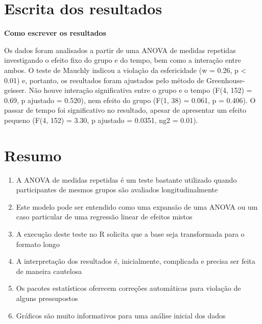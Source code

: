 \documentclass[
]{book}
\providecommand{\tightlist}{%
  \setlength{\itemsep}{0pt}\setlength{\parskip}{0pt}}
\begin{document}
\hypertarget{escrita-dos-resultados-10}{%
\section{Escrita dos resultados}\label{escrita-dos-resultados-10}}

\textbf{Como escrever os resultados}

Os dados foram analisados a partir de uma ANOVA de medidas repetidas investigando o efeito fixo do grupo e do tempo, bem como a interação entre ambos. O teste de Mauchly indicou a violação da esfericidade (w = 0.26, p \textless{} 0.01) e, portanto, os resultados foram ajustados pelo método de Greenhouse-geisser. Não houve interação significativa entre o grupo e o tempo (F(4, 152) = 0.69, p ajustado = 0.520), nem efeito do grupo (F(1, 38) = 0.061, p = 0.406). O passar de tempo foi significativo no resultado, apesar de apresentar um efeito pequeno (F(4, 152) = 3.30, p ajustado = 0.0351, ng2 = 0.01).

\hypertarget{resumo-12}{%
\section{Resumo}\label{resumo-12}}

\begin{enumerate}
\def\labelenumi{\arabic{enumi}.}
\tightlist
\item
  A ANOVA de medidas repetidas é um teste bastante utilizado quando participantes de mesmos grupos são avaliados longitudinalmente\\
\item
  Este modelo pode ser entendido como uma expansão de uma ANOVA ou um caso particular de uma regressão linear de efeitos mistos\\
\item
  A execução deste teste no R solicita que a base seja transformada para o formato longo\\
\item
  A interpretação dos resultados é, inicialmente, complicada e precisa ser feita de maneira cautelosa\\
\item
  Os pacotes estatísticos oferecem correções automáticas para violação de alguns pressupostos\\
\item
  Gráficos são muito informativos para uma análise inicial dos dados\\
\end{enumerate}
\end{document}
